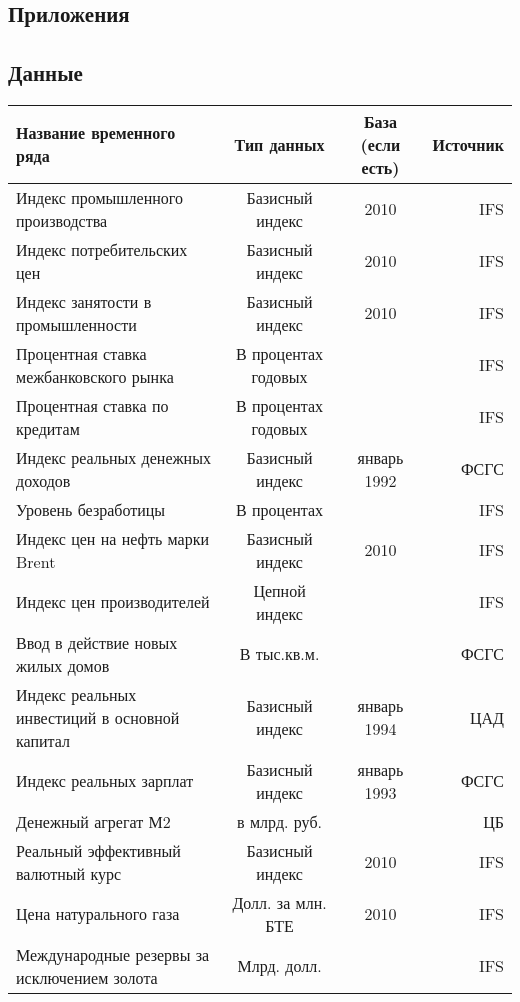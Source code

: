 \documentclass[11pt]{article} %
\begin{document}




\newpage

\printbibliography
\newpage
\begin{landscape}
\section*{Приложения}
\subsection*{Данные}
\begin{center}
\begin{table}[h!]
\begin{tabular}{lccr}
\toprule
Название временного ряда& Тип данных &  База (если есть) & Источник \\
\midrule
Индекс промышленного производства & Базисный индекс & 2010 & IFS \\
Индекс потребительских цен & Базисный индекс & 2010 & IFS \\
Индекс занятости в промышленности & Базисный индекс & 2010 & IFS \\
Процентная ставка межбанковского рынка & В процентах годовых &  & IFS \\
Процентная ставка по кредитам & В процентах годовых &  & IFS \\
Индекс реальных денежных доходов & Базисный индекс & январь 1992 & ФСГС\\
Уровень безработицы & В процентах &  & IFS \\
Индекс цен на нефть марки Brent & Базисный индекс & 2010 & IFS \\
Индекс цен производителей & Цепной индекс &  & IFS \\
Ввод в действие новых жилых домов & В тыс.кв.м. &  & ФСГС \\
Индекс реальных инвестиций в основной капитал& Базисный индекс & январь 1994 & ЦАД \\
Индекс реальных зарплат & Базисный индекс & январь 1993 & ФСГС \\
Денежный агрегат М2 & в млрд. руб.  &  & ЦБ \\
Реальный эффективный валютный курс & Базисный индекс & 2010 & IFS \\
Цена натурального газа & Долл. за млн. БТЕ & 2010 & IFS \\
Международные резервы за исключением золота & Млрд. долл. &  & IFS \\

\end{tabular}
\end{table}
\end{center}
\end{landscape}
\end{document}
